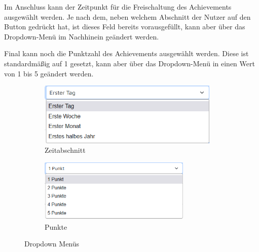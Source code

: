 \documentclass[11pt]{article}
\begin{document}
Im Anschluss kann der Zeitpunkt für die Freischaltung des Achievements ausgewählt werden.
Je nach dem, neben welchem Abschnitt der Nutzer auf den Button gedrückt hat, ist dieses Feld bereits
vorausgefüllt, kann aber über das Dropdown-Menü im Nachhinein geändert werden.


Final kann noch die Punktzahl des Achievements ausgewählt werden. Diese ist standardmäßig auf 1
gesetzt, kann aber über das Dropdown-Menü in einen Wert von 1 bis 5 geändert werden.

\begin{figure}[H]
    \begin{subfigure}{.5\textwidth}
        \centering
        \includegraphics[height=3cm]{application/dropdown_time.png}
        \caption{Zeitabschnitt}
    \end{subfigure}
    \begin{subfigure}{.5\textwidth}
        \centering
        \includegraphics[height=3cm]{application/dropdown_points.png}
        \caption{Punkte}
    \end{subfigure}
    \caption{Dropdown Menüs}
\end{figure}
\end{document}
